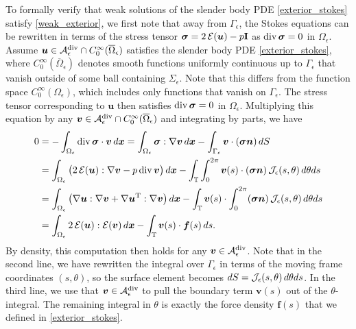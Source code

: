 \documentclass[11pt]{article}
\numberwithin{equation}{section}
\newcommand{\T}{\mathbb{T}}
\newcommand{\A}{\mathcal{A}}
\newcommand{\E}{\mathcal{E}}
\newcommand{\bu}{\bm{u}}
\newcommand{\bx}{\bm{x}}
\newcommand{\bv}{\bm{v}}
\newcommand{\ts}{\thinspace}
\newcommand{\dive}{{\rm{div}}}
\theoremstyle{definition}
\begin{document}
To formally verify that weak solutions of the slender body PDE \eqref{exterior_stokes} satisfy \eqref{weak_exterior}, we first note that away from $\Gamma_{\epsilon}$, the Stokes equations can be rewritten in terms of the stress tensor $\bm{\sigma} = 2 \ts\E(\bu) - p{\bf I}$ as $\dive \ts \bm{\sigma} = 0$ in $\Omega_{\epsilon}$. Assume $\bu \in \A_{\epsilon}^{\dive}\cap C_0^{\infty}(\overline\Omega_{\epsilon})$ satisfies the slender body PDE \eqref{exterior_stokes}, where $C^{\infty}_0(\overline \Omega_{\epsilon})$ denotes smooth functions uniformly continuous up to $\Gamma_\epsilon$ that vanish outside of some ball containing $\Sigma_\epsilon$. Note that this differs from the function space $C^{\infty}_0(\Omega_{\epsilon})$, which includes only functions that vanish on $\Gamma_\epsilon$. The stress tensor corresponding to $\bu$ then satisfies $\dive\ts\bm{\sigma} = 0$ in $\Omega_{\epsilon}$. Multiplying this equation by any $\bv \in \A_{\epsilon}^{\dive}\cap C^\infty_0(\overline \Omega_\epsilon)$ and integrating by parts, we have 
\begin{align*}
0 &= -\int_{\Omega_{\epsilon}} \dive \ts \bm{\sigma} \cdot \bv \ts d\bx = \int_{\Omega_{\epsilon}} \bm{\sigma} : \nabla \bv \ts d\bx - \int_{\Gamma_{\epsilon}} \bv \cdot (\bm{\sigma}{\bm n}) \ts dS \\
&= \int_{\Omega_{\epsilon}} \big(2\ts \E(\bu): \nabla \bv - p\ts \dive\ts \bv\big) \ts d\bx - \int_{\T}\int_0^{2\pi}\bv(s) \cdot(\bm{\sigma}{\bm n}) \ts \mathcal{J}_{\epsilon}(s,\theta) \ts d\theta ds \\
&= \int_{\Omega_{\epsilon}} \big(\nabla \bu: \nabla \bv+\nabla\bu^{\rm T}:\nabla \bv\big) \ts d\bx - \int_{\T}\bv(s)\cdot \int_0^{2\pi} (\bm{\sigma}{\bm n}) \ts \mathcal{J}_{\epsilon}(s,\theta) \ts d\theta ds \\
&= \int_{\Omega_{\epsilon}} 2 \ts\E(\bu): \E(\bv) \ts d\bx - \int_{\T} \bv(s) \cdot {\bm f}(s) \ts ds. 
\end{align*}
By density, this computation then holds for any $\bv \in \A_{\epsilon}^{\dive}$. Note that in the second line, we have rewritten the integral over $\Gamma_\epsilon$ in terms of the moving frame coordinates $(s,\theta)$, so the surface element becomes $dS= \mathcal{J}_{\epsilon}(s,\theta) \ts d\theta ds$. In the third line, we use that $\bv\in \A_{\epsilon}^{\dive}$ to pull the boundary term $\bv(s)$ out of the $\theta$-integral. The remaining integral in $\theta$ is exactly the force density $\bm{f}(s)$ that we defined in \eqref{exterior_stokes}. \\
\end{document}
